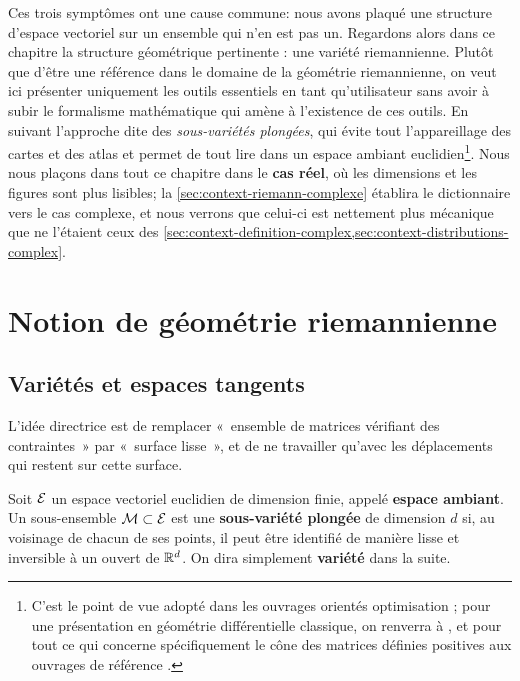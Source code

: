 Ces trois symptômes ont une cause commune: nous avons plaqué une structure d'espace vectoriel sur un ensemble qui n'en est pas un. Regardons alors dans ce chapitre la structure géométrique pertinente : une variété riemannienne. Plutôt que d'être une référence dans le domaine de la géométrie riemannienne, on veut ici présenter uniquement les outils essentiels en tant qu'utilisateur sans avoir à subir le formalisme mathématique qui amène à l'existence de ces outils. En suivant l'approche dite des \emph{sous-variétés plongées}, qui évite tout l'appareillage des cartes et des atlas et permet de tout lire dans un espace ambiant euclidien\footnote{C'est le point de vue adopté dans les ouvrages orientés optimisation ; pour une présentation en géométrie différentielle classique, on renverra à , et pour tout ce qui concerne spécifiquement le cône des matrices définies positives aux ouvrages de référence .}. Nous nous plaçons dans tout ce chapitre dans le \textbf{cas réel}, où les dimensions et les figures sont plus lisibles; la \cref{sec:context-riemann-complexe} établira le dictionnaire vers le cas complexe, et nous verrons que celui-ci est nettement plus mécanique que ne l'étaient ceux des \cref{sec:context-definition-complex,sec:context-distributions-complex}.




\section{Notion de géométrie riemannienne}
\label{sec:context-riemann-notion}

\subsection{Variétés et espaces tangents}

L'idée directrice est de remplacer «~ensemble de matrices vérifiant des contraintes~» par «~surface lisse~», et de ne travailler qu'avec les déplacements qui restent sur cette surface.

\begin{definition}
\label{def:context-riemann-manifold}
  Soit $\mathcal{E}$ un espace vectoriel euclidien de dimension finie, appelé \textbf{espace ambiant}. Un sous-ensemble $\mathcal{M}\subset\mathcal{E}$ est une \textbf{sous-variété plongée} de dimension $d$ si, au voisinage de chacun de ses points, il peut être identifié de manière lisse et inversible à un ouvert de $\mathbb{R}^d$. On dira simplement \textbf{variété} dans la suite.
\end{definition}

